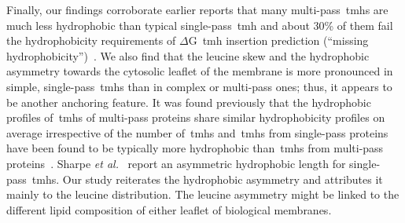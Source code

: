 Finally, our findings corroborate earlier reports that many multi\--pass~\gls{tmh}s are much less hydrophobic than typical single\--pass~\gls{tmh} and about 30\% of them fail the hydrophobicity requirements of $\Delta$G~\gls{tmh} insertion prediction (``missing hydrophobicity'')~\cite{Hessa2005, Hedin2010, Hessa2007, Ojemalm2012}.
We also find that the leucine skew and the hydrophobic asymmetry towards the cytosolic leaflet of the membrane is more pronounced in simple, single\--pass~\gls{tmh}s than in complex or multi\--pass ones; thus, it appears to be another anchoring feature.
It was found previously that the hydrophobic profiles of~\gls{tmh}s of multi\--pass proteins share similar hydrophobicity profiles on average irrespective of the number of~\gls{tmh}s and~\gls{tmh}s from single\--pass proteins have been found to be typically more hydrophobic than~\gls{tmh}s from multi\--pass proteins~\cite{Wong2011}.
Sharpe \textit{et al.}~\cite{Sharpe2010} report an asymmetric hydrophobic length for single\--pass~\gls{tmh}s.
Our study reiterates the hydrophobic asymmetry and attributes it mainly to the leucine distribution.
The leucine asymmetry might be linked to the different lipid composition of either leaflet of biological membranes.

